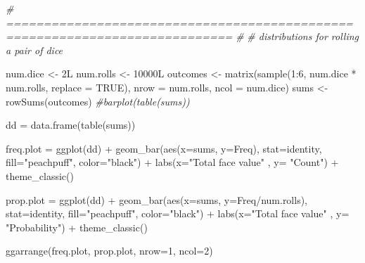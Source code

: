 \documentclass[
]{article}
\newenvironment{Shaded}{\begin{snugshade}}{\end{snugshade}}
\newcommand{\AttributeTok}[1]{\textcolor[rgb]{0.77,0.63,0.00}{#1}}
\newcommand{\CommentTok}[1]{\textcolor[rgb]{0.56,0.35,0.01}{\textit{#1}}}
\newcommand{\ConstantTok}[1]{\textcolor[rgb]{0.00,0.00,0.00}{#1}}
\newcommand{\DecValTok}[1]{\textcolor[rgb]{0.00,0.00,0.81}{#1}}
\newcommand{\FunctionTok}[1]{\textcolor[rgb]{0.00,0.00,0.00}{#1}}
\newcommand{\NormalTok}[1]{#1}
\newcommand{\OtherTok}[1]{\textcolor[rgb]{0.56,0.35,0.01}{#1}}
\newcommand{\SpecialCharTok}[1]{\textcolor[rgb]{0.00,0.00,0.00}{#1}}
\newcommand{\StringTok}[1]{\textcolor[rgb]{0.31,0.60,0.02}{#1}}
\begin{document}
\begin{Shaded}
\begin{Highlighting}[]
\CommentTok{\# ============================================================================ \#}
\CommentTok{\# distributions for rolling a pair of dice}

\NormalTok{num.dice }\OtherTok{\textless{}{-}}\NormalTok{ 2L}
\NormalTok{num.rolls }\OtherTok{\textless{}{-}}\NormalTok{ 10000L}
\NormalTok{outcomes }\OtherTok{\textless{}{-}} \FunctionTok{matrix}\NormalTok{(}\FunctionTok{sample}\NormalTok{(}\DecValTok{1}\SpecialCharTok{:}\DecValTok{6}\NormalTok{, num.dice }\SpecialCharTok{*}\NormalTok{ num.rolls, }\AttributeTok{replace =} \ConstantTok{TRUE}\NormalTok{),}
                   \AttributeTok{nrow =}\NormalTok{ num.rolls, }\AttributeTok{ncol =}\NormalTok{ num.dice)}
\NormalTok{sums }\OtherTok{\textless{}{-}} \FunctionTok{rowSums}\NormalTok{(outcomes)}
\CommentTok{\#barplot(table(sums))}

\NormalTok{dd }\OtherTok{=} \FunctionTok{data.frame}\NormalTok{(}\FunctionTok{table}\NormalTok{(sums))}

\NormalTok{freq.plot }\OtherTok{=} \FunctionTok{ggplot}\NormalTok{(dd) }\SpecialCharTok{+}
  \FunctionTok{geom\_bar}\NormalTok{(}\FunctionTok{aes}\NormalTok{(}\AttributeTok{x=}\NormalTok{sums, }\AttributeTok{y=}\NormalTok{Freq), }\AttributeTok{stat=}\StringTok{\textquotesingle{}identity\textquotesingle{}}\NormalTok{, }\AttributeTok{fill=}\StringTok{"peachpuff"}\NormalTok{, }\AttributeTok{color=}\StringTok{"black"}\NormalTok{) }\SpecialCharTok{+}
  \FunctionTok{labs}\NormalTok{(}\AttributeTok{x=}\StringTok{"Total face value"}\NormalTok{ , }\AttributeTok{y=} \StringTok{"Count"}\NormalTok{) }\SpecialCharTok{+}
  \FunctionTok{theme\_classic}\NormalTok{()}

\NormalTok{prop.plot }\OtherTok{=} \FunctionTok{ggplot}\NormalTok{(dd) }\SpecialCharTok{+}
  \FunctionTok{geom\_bar}\NormalTok{(}\FunctionTok{aes}\NormalTok{(}\AttributeTok{x=}\NormalTok{sums, }\AttributeTok{y=}\NormalTok{Freq}\SpecialCharTok{/}\NormalTok{num.rolls), }\AttributeTok{stat=}\StringTok{\textquotesingle{}identity\textquotesingle{}}\NormalTok{, }\AttributeTok{fill=}\StringTok{"peachpuff"}\NormalTok{, }\AttributeTok{color=}\StringTok{"black"}\NormalTok{) }\SpecialCharTok{+}
  \FunctionTok{labs}\NormalTok{(}\AttributeTok{x=}\StringTok{"Total face value"}\NormalTok{ , }\AttributeTok{y=} \StringTok{"Probability"}\NormalTok{) }\SpecialCharTok{+}
  \FunctionTok{theme\_classic}\NormalTok{()}

\FunctionTok{ggarrange}\NormalTok{(freq.plot, prop.plot, }\AttributeTok{nrow=}\DecValTok{1}\NormalTok{, }\AttributeTok{ncol=}\DecValTok{2}\NormalTok{)}
\end{Highlighting}
\end{Shaded}
\end{document}
